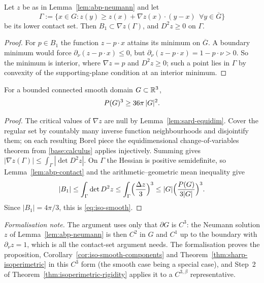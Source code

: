 \begin{lemma}
\label{lem:abp-contact}
Let $z$ be as in Lemma~\ref{lem:abp-neumann} and let
\[
  \Gamma:=\{x\in G: z(y)\ge z(x)+\nabla z(x)\cdot(y-x)\ \ \forall y\in\overline G\}
\]
be its lower contact set.  Then $B_1\subset\nabla z(\Gamma)$, and
$D^2z\ge0$ on $\Gamma$.
\end{lemma}

\begin{proof}
For $p\in B_1$ the function $z-p\cdot x$ attains its minimum on
$\overline G$.  A boundary minimum would force
$\partial_\nu(z-p\cdot x)\le0$, but
$\partial_\nu(z-p\cdot x)=1-p\cdot\nu>0$.  So the minimum is interior, where
$\nabla z=p$ and $D^2z\ge0$; such a point lies in $\Gamma$ by convexity of the
supporting-plane condition at an interior minimum.
\end{proof}

\begin{proposition}\label{prop:iso-smooth}
For a bounded connected smooth domain $G\subset\mathbb R^3$,
\begin{equation}\label{eq:iso-smooth}
  P(G)^3\ge36\pi\,|G|^2 .
\end{equation}
\end{proposition}

\begin{proof}
The critical values of $\nabla z$ are null by
Lemma~\ref{lem:sard-equidim}.  Cover the regular set by countably many inverse
function neighbourhoods and disjointify them; on each resulting Borel piece
the equidimensional change-of-variables theorem from \ref{base:calculus}
applies injectively.  Summing gives
$|\nabla z(\Gamma)|\le\int_\Gamma|\det D^2z|$.  On $\Gamma$ the Hessian is
positive semidefinite, so Lemma~\ref{lem:abp-contact} and the
arithmetic--geometric mean inequality give
\[
  |B_1|\le\int_\Gamma\det D^2z
  \le\int_\Gamma\Bigl(\frac{\Delta z}{3}\Bigr)^3
  \le|G|\Bigl(\frac{P(G)}{3|G|}\Bigr)^3 .
\]
Since $|B_1|=4\pi/3$, this is \eqref{eq:iso-smooth}.
\end{proof}

\medskip\noindent\emph{Formalisation note.} The argument uses only that $\partial G$ is $C^3$: the Neumann solution $z$ of Lemma~\ref{lem:abp-neumann} is then $C^2$ in $G$ and $C^1$ up to the boundary with $\partial_\nu z=1$, which is all the contact-set argument needs. The formalisation proves the proposition, Corollary~\ref{cor:iso-smooth-components} and Theorem~\ref{thm:sharp-isoperimetric} in this $C^3$ form (the smooth case being a special case), and Step~2 of Theorem~\ref{thm:isoperimetric-rigidity} applies it to a $C^{3,\beta}$ representative.

